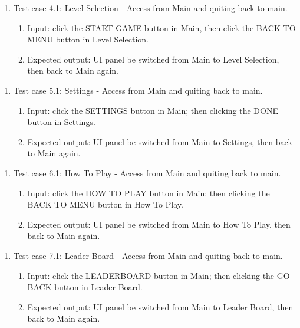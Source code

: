 \documentclass[11pt]{article}
\begin{document}
    \begin{enumerate}
        \item Test case 4.1: Level Selection - Access from Main and quiting back to main.
        \begin{enumerate}
            \item  Input: click the START GAME button in Main, then click the BACK TO MENU button in Level Selection.
            \item  Expected output: UI panel be switched from Main to Level Selection, then back to Main again.
        \end{enumerate}
    \end{enumerate}
    \begin{enumerate}
        \item Test case 5.1: Settings - Access from Main and quiting back to main.
        \begin{enumerate}
            \item  Input: click the SETTINGS button in Main; then clicking the DONE button in Settings.
            \item  Expected output: UI panel be switched from Main to Settings, then back to Main again.
        \end{enumerate}
    \end{enumerate}
    \begin{enumerate}
        \item Test case 6.1: How To Play - Access from Main and quiting back to main.
        \begin{enumerate}
            \item  Input: click the HOW TO PLAY button in Main; then clicking the BACK TO MENU button in How To Play.
            \item  Expected output: UI panel be switched from Main to How To Play, then back to Main again.
        \end{enumerate}
    \end{enumerate}
    \begin{enumerate}
        \item Test case 7.1: Leader Board - Access from Main and quiting back to main.
        \begin{enumerate}
            \item  Input: click the LEADERBOARD button in Main; then clicking the GO BACK button in Leader Board.
            \item  Expected output: UI panel be switched from Main to Leader Board, then back to Main again.
        \end{enumerate}
    \end{enumerate}
\end{document}
